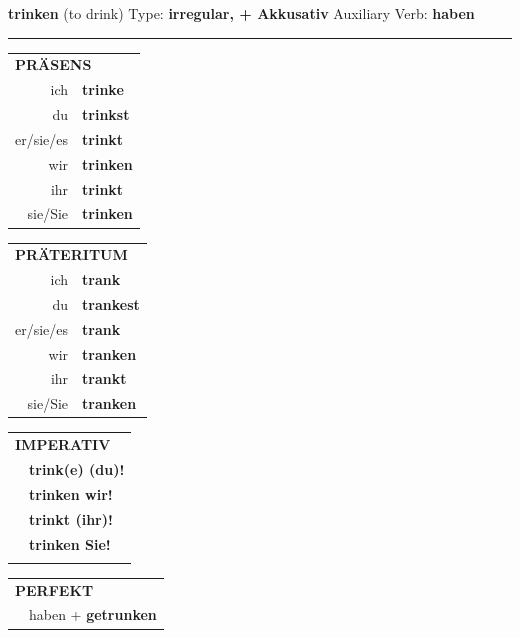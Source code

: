 \documentclass[10pt,a4paper]{revtex4-2}
\begin{document}
\begin{verbbox-acc}
    {\Large \bf trinken} (to drink) \hfill Type: \textbf{irregular, + Akkusativ} \hfill Auxiliary Verb: \textbf{haben} 
    
     \vspace{5pt}

    \hrule
    
    \vspace{5pt}

  \begin{tabular}{rl}
     \multicolumn{2}{l}{\textbf{PRÄSENS} }\\
    ich & \textbf{trinke}\\
    du & \textbf{trinkst}\\
    er/sie/es & \textbf{trinkt}\\
    wir & \textbf{trinken}\\
    ihr & \textbf{trinkt}\\
    sie/Sie & \textbf{trinken}\\
  \end{tabular}
  \hfill
     \begin{tabular}{rl}
    \multicolumn{2}{l}{\textbf{PRÄTERITUM} }\\
    ich & \textbf{trank}\\
    du & \textbf{trankest}\\
    er/sie/es & \textbf{trank}\\
    wir & \textbf{tranken}\\
    ihr & \textbf{trankt}\\
    sie/Sie & \textbf{tranken}\\
  \end{tabular}
  \hfill
  \begin{tabular}{rl}
     \multicolumn{2}{l}{\textbf{IMPERATIV} }\\
   & \textbf{trink(e) (du)!}\\
   & \textbf{trinken wir!}\\
   & \textbf{trinkt (ihr)!}\\
   & \textbf{trinken Sie!}\\
   & \vspace{10pt}
  \end{tabular}

    \vspace{10pt}

 \begin{tabular}{rl}
     \multicolumn{2}{l}{\textbf{PERFEKT}}\\
   & haben + \textbf{getrunken}\\
  \end{tabular}
\hfill
   \begin{tabular}{rl}
   

\end{tabular}
\end{verbbox-acc}
\end{document}
